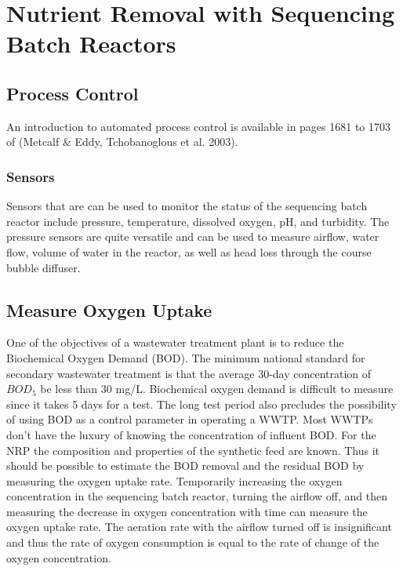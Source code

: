 \documentclass[letterpaper,10pt,english]{sphinxmanual}
\begin{document}
\chapter{Nutrient Removal with Sequencing Batch Reactors}
\label{\detokenize{Nutrient_Removal/Nutrient_Removal:nutrient-removal-with-sequencing-batch-reactors}}\label{\detokenize{Nutrient_Removal/Nutrient_Removal:title-nutrient-removal-with-sequencing-batch-reactors}}\label{\detokenize{Nutrient_Removal/Nutrient_Removal::doc}}

\section{Process Control}
\label{\detokenize{Nutrient_Removal/Nutrient_Removal:process-control}}\label{\detokenize{Nutrient_Removal/Nutrient_Removal:heading-nrp-process-control}}
An introduction to automated process control is available in pages 1681 to 1703 of (Metcalf \& Eddy, Tchobanoglous et al. 2003).


\subsection{Sensors}
\label{\detokenize{Nutrient_Removal/Nutrient_Removal:sensors}}
Sensors that are can be used to monitor the status of the sequencing batch reactor include pressure, temperature, dissolved oxygen, pH, and turbidity. The pressure sensors are quite versatile and can be used to measure airflow, water flow, volume of water in the reactor, as well as head loss through the course bubble diffuser.


\section{Measure Oxygen Uptake}
\label{\detokenize{Nutrient_Removal/Nutrient_Removal:measure-oxygen-uptake}}\label{\detokenize{Nutrient_Removal/Nutrient_Removal:heading-nrp-measure-oxygen-uptake}}
One of the objectives of a wastewater treatment plant is to reduce the Biochemical Oxygen Demand (BOD). The minimum national standard for secondary wastewater treatment is that the average 30-day concentration of \(BOD_5\) be less than 30 mg/L. Biochemical oxygen demand is difficult to measure since it takes 5 days for a test. The long test period also precludes the possibility of using BOD as a control parameter in operating a WWTP. Most WWTPs don’t have the luxury of knowing the concentration of influent BOD. For the NRP the composition and properties of the synthetic feed are known. Thus it should be possible to estimate the BOD removal and the residual BOD by measuring the oxygen uptake rate. Temporarily increasing the oxygen concentration in the sequencing batch reactor, turning the airflow off, and then measuring the decrease in oxygen concentration with time can measure the oxygen uptake rate. The aeration rate with the airflow turned off is insignificant and thus the rate of oxygen consumption is equal to the rate of change of the oxygen concentration.
\end{document}
